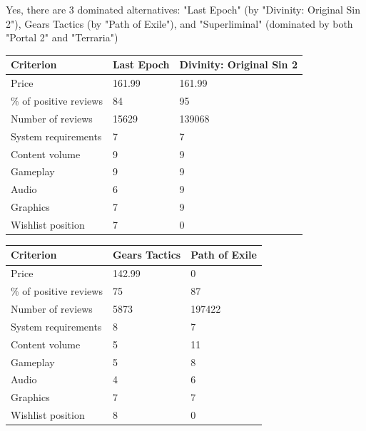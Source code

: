 \documentclass{article}
\begin{document}
\begin{enumerate}
    Yes, there are 3 dominated alternatives: "Last Epoch" (by "Divinity: Original Sin 2"), Gears Tactics (by "Path of Exile"), and "Superliminal" (dominated by both "Portal 2" and "Terraria")

    \begin{center}
        \begin{tabular}{ m{10em}|m{8em}|m{8em} }
            Criterion & Last Epoch & Divinity: Original Sin 2 \\
            \hline
            \hline
            Price & 161.99 & 161.99 \\
            \% of positive reviews & 84 & 95 \\
            Number of reviews & 15629 & 139068 \\
            System requirements & 7 & 7 \\
            Content volume & 9 & 9 \\
            Gameplay & 9 & 9 \\
            Audio & 6 & 9 \\
            Graphics & 7 & 9 \\
            Wishlist position & 7 & 0 \\
        \end{tabular}
    \end{center}


    \begin{center}
        \begin{tabular}{ m{10em}|m{8em}|m{8em} }
            Criterion & Gears Tactics & Path of Exile \\
            \hline
            \hline
            Price & 142.99 & 0 \\
            \% of positive reviews & 75 & 87 \\
            Number of reviews & 5873 & 197422 \\
            System requirements & 8 & 7 \\
            Content volume & 5 & 11 \\
            Gameplay & 5 & 8 \\
            Audio & 4 & 6 \\
            Graphics & 7 & 7 \\
            Wishlist position & 8 & 0 \\
        \end{tabular}
    \end{center}


\end{enumerate}
\end{document}
